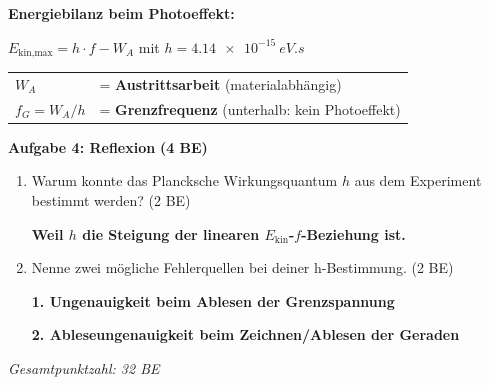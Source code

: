 \documentclass[11pt,a4paper]{article}
\newcommand{\lsg}[1]{\textcolor{loesung}{\textbf{#1}}}
\begin{document}
\begin{tcolorbox}[merkbox={Kasten 3: Die Photogleichung (Ergebnis)}]
\textbf{Energiebilanz beim Photoeffekt:}

\vspace{0.3em}
\hfill $\boxed{E_{\text{kin,max}} = h \cdot f - W_A}$ \hfill mit \hfill $h = \SI{4,14e-15}{eV.s}$ \hfill\mbox{}

\vspace{0.5em}
\begin{tabular}{ll}
$W_A$ & = \textbf{Austrittsarbeit} (materialabhängig) \\
$f_G = W_A / h$ & = \textbf{Grenzfrequenz} (unterhalb: kein Photoeffekt) \\
\end{tabular}
\end{tcolorbox}

\vspace{0.3em}


\textbf{Aufgabe 4: Reflexion} \hfill \textbf{(4 BE)}

\begin{enumerate}[label=\alph*)]
\item Warum konnte das Plancksche Wirkungsquantum $h$ aus dem Experiment bestimmt werden? \hfill (2 BE)

\lsg{Weil $h$ die Steigung der linearen $E_{\text{kin}}$-$f$-Beziehung ist.}

\vspace{0.5cm}

\item Nenne zwei mögliche Fehlerquellen bei deiner h-Bestimmung. \hfill (2 BE)

\lsg{1. Ungenauigkeit beim Ablesen der Grenzspannung}

\lsg{2. Ableseungenauigkeit beim Zeichnen/Ablesen der Geraden}

\end{enumerate}

\begin{center}
\small\textit{Gesamtpunktzahl: 32 BE}
\end{center}
\end{document}

